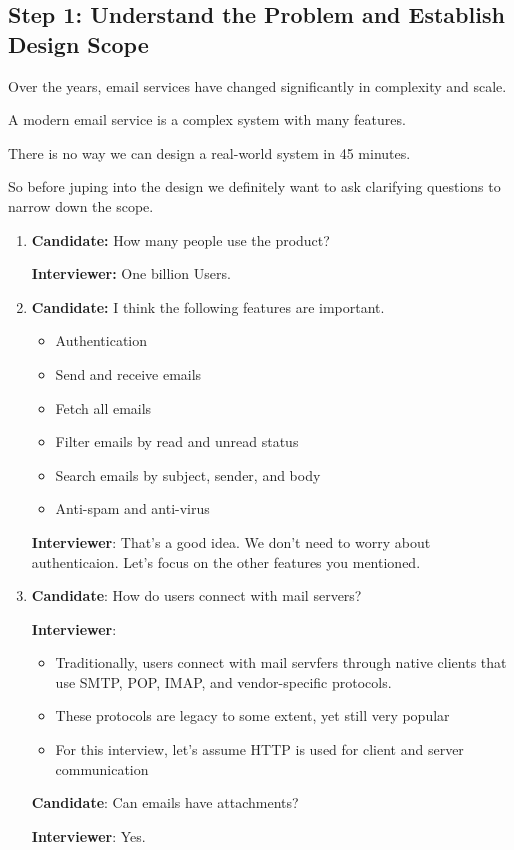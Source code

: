 \documentclass{report}
\theoremstyle{definition}
\let\oldsubsection\subsection
\renewcommand{\subsection}{\oldsubsection*}
\begin{document}
\subsection{Step 1: Understand the Problem and Establish Design Scope}

Over the years, email services have changed significantly in complexity and scale.

A modern email service is a complex system with many features.

There is no way we can design a real-world system in 45 minutes.

So before juping into the design we definitely want to ask clarifying questions to narrow down the scope.

\begin{enumerate}
\item

\textbf{Candidate:} How many people use the product?

\textbf{Interviewer:} One billion Users.

\item

\textbf{Candidate:} I think the following features are important.

\begin{itemize}
\item
Authentication
\item
Send and receive emails
\item
Fetch all emails
\item
Filter emails by read and unread status
\item
Search emails by subject, sender, and body
\item
Anti-spam and anti-virus
\end{itemize}

\textbf{Interviewer}: That's a good idea. We don't need to worry about authenticaion. Let's focus on the other features you mentioned.

\item
\textbf{Candidate}: How do users connect with mail servers?

\textbf{Interviewer}:
\begin{itemize}
\item
Traditionally, users connect with mail servfers through native clients that use SMTP, POP, IMAP, and vendor-specific protocols.
\item
These protocols are legacy to some extent, yet still very popular
\item
For this interview, let's assume HTTP is used for client and server communication
\end{itemize}

\textbf{Candidate}: Can emails have attachments?

\textbf{Interviewer}: Yes.
\end{enumerate}
\end{document}
